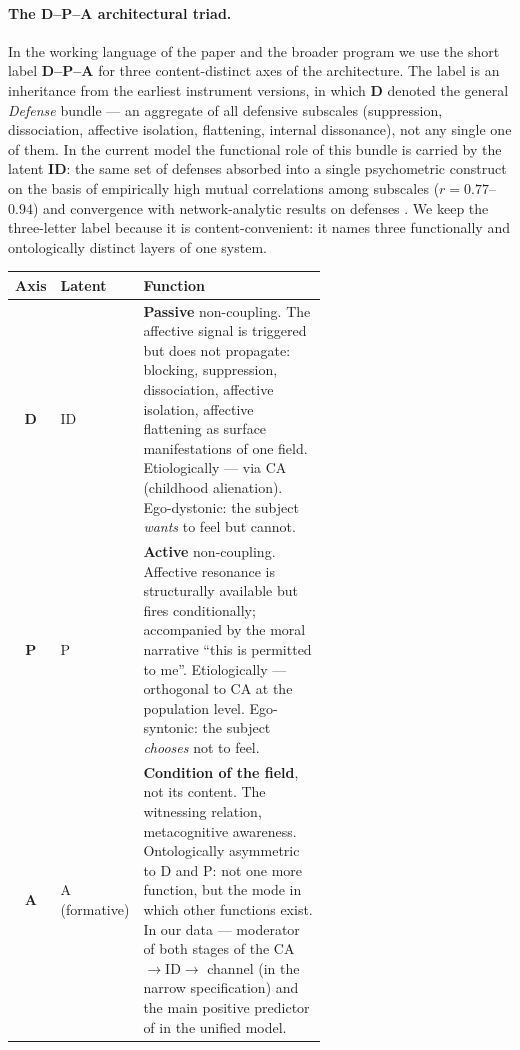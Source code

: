 \paragraph{The D--P--A architectural triad.} In the working language of the paper and the broader program we use the short label \textbf{D--P--A} for three content-distinct axes of the architecture. The label is an inheritance from the earliest instrument versions, in which \textbf{D} denoted the general \emph{Defense} bundle --- an aggregate of all defensive subscales (suppression, dissociation, affective isolation, flattening, internal dissonance), not any single one of them. In the current model the functional role of this bundle is carried by the latent \textbf{ID}: the same set of defenses absorbed into a single psychometric construct on the basis of empirically high mutual correlations among subscales ($r = 0.77$--$0.94$) and convergence with network-analytic results on defenses \citep{digiuseppe2024}. We keep the three-letter label because it is content-convenient: it names three functionally and ontologically distinct layers of one system.

\begin{center}
\begin{tabular}{clp{0.62\linewidth}}
\toprule
\textbf{Axis} & \textbf{Latent} & \textbf{Function} \\
\midrule
\textbf{D} & ID & \textbf{Passive} non-coupling. The affective signal is triggered but does not propagate: blocking, suppression, dissociation, affective isolation, affective flattening as surface manifestations of one field. Etiologically --- via CA (childhood alienation). Ego-dystonic: the subject \emph{wants} to feel but cannot. \\
\midrule
\textbf{P} & P & \textbf{Active} non-coupling. Affective resonance is structurally available but fires conditionally; accompanied by the moral narrative ``this is permitted to me''. Etiologically --- orthogonal to CA at the population level. Ego-syntonic: the subject \emph{chooses} not to feel. \\
\midrule
\textbf{A} & A (formative) & \textbf{Condition of the field}, not its content. The witnessing relation, metacognitive awareness. Ontologically asymmetric to D and P: not one more function, but the mode in which other functions exist. In our data --- moderator of both stages of the CA$\to$ID$\to$\EAF{} channel (in the narrow specification) and the main positive predictor of \EAF{} in the unified model. \\
\bottomrule
\end{tabular}
\end{center}

